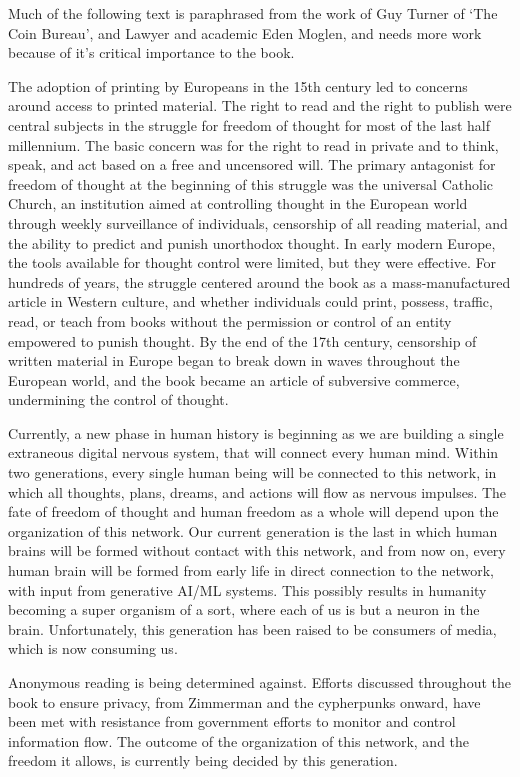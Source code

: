 Much of the following text is paraphrased from the work of Guy Turner of `The Coin Bureau', and Lawyer and academic Eden Moglen, and needs more work because of it's critical importance to the book.\par 
The adoption of printing by Europeans in the 15th century led to concerns around access to printed material. The right to read and the right to publish were central subjects in the struggle for freedom of thought for most of the last half millennium. The basic concern was for the right to read in private and to think, speak, and act based on a free and uncensored will. The primary antagonist for freedom of thought at the beginning of this struggle was the universal Catholic Church, an institution aimed at controlling thought in the European world through weekly surveillance of individuals, censorship of all reading material, and the ability to predict and punish unorthodox thought. In early modern Europe, the tools available for thought control were limited, but they were effective. For hundreds of years, the struggle centered around the book as a mass-manufactured article in Western culture, and whether individuals could print, possess, traffic, read, or teach from books without the permission or control of an entity empowered to punish thought. By the end of the 17th century, censorship of written material in Europe began to break down in waves throughout the European world, and the book became an article of subversive commerce, undermining the control of thought.\par
Currently, a new phase in human history is beginning as we are building a single extraneous digital nervous system, that will connect every human mind. Within two generations, every single human being will be connected to this network, in which all thoughts, plans, dreams, and actions will flow as nervous impulses. The fate of freedom of thought and human freedom as a whole will depend upon the organization of this network. Our current generation is the last in which human brains will be formed without contact with this network, and from now on, every human brain will be formed from early life in direct connection to the network, with input from generative AI/ML systems. This possibly results in humanity becoming a super organism of a sort, where each of us is but a neuron in the brain. Unfortunately, this generation has been raised to be consumers of media, which is now consuming us.\par Anonymous reading is being determined against. Efforts discussed throughout the book to ensure privacy, from Zimmerman and the cypherpunks onward, have been met with resistance from government efforts to monitor and control information flow. The outcome of the organization of this network, and the freedom it allows, is currently being decided by this generation.\par
